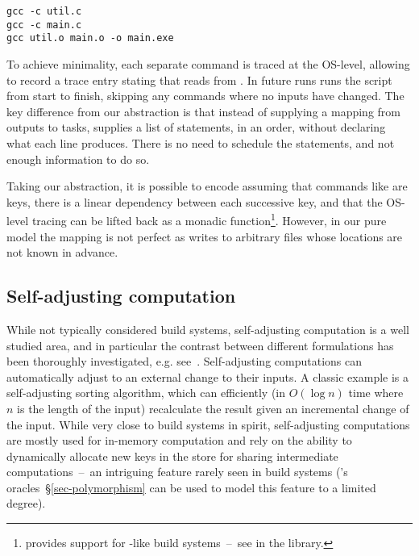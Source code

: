 \begin{verbatim}
gcc -c util.c
gcc -c main.c
gcc util.o main.o -o main.exe
\end{verbatim}

\noindent
To achieve minimality, each separate command is traced at the OS-level, allowing
\Fabricate to record a trace entry stating that  reads from
. In future runs \Fabricate runs the script from start to finish,
skipping any commands where no inputs have changed. The key difference from our
 abstraction is that instead of supplying a mapping from outputs to
tasks, \Fabricate supplies a list of statements, in an order, without declaring
what each line produces. There is no need to schedule the statements, and not
enough information to do so.

Taking our abstraction, it is possible to encode \Fabricate assuming that
commands like  are keys, there is a linear dependency between
each successive key, and that the OS-level tracing can be lifted back as a
monadic  function\footnote{\Shake provides support for
\Fabricate{}-like build systems~--~see 
in the \Shake library.}. However, in our pure model the mapping is not perfect
as  writes to arbitrary files whose locations are not known in advance.

\subsection{Self-adjusting computation}

While not typically considered build systems, self-adjusting computation is a
well studied area, and in particular the contrast between different formulations
has been thoroughly investigated, e.g. see~\citet{acar2007selfadjusting}.
Self-adjusting computations can automatically adjust to an external change
to their inputs. A classic example is a self-adjusting sorting algorithm, which
can efficiently (in $O(\log{n})$ time where $n$ is the length of the input)
recalculate the result given an incremental change of the input. While very
close to build systems in spirit, self-adjusting computations are mostly used
for in-memory computation and rely on the ability to dynamically allocate new
keys in the store for sharing intermediate computations~--~an intriguing feature
rarely seen in build systems (\Shake's oracles~\S\ref{sec-polymorphism} can be
used to model this feature to a limited degree).

